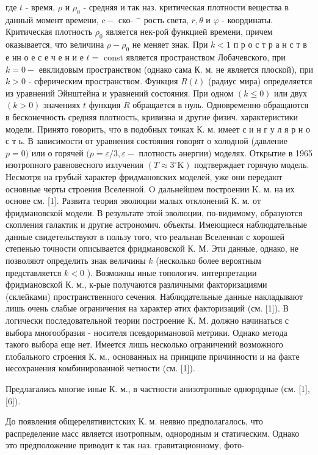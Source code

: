 \documentclass[10pt]{article}
\begin{document}
где $t$ - время, $\rho$ и $\rho_{0}$ - средняя и так наз. критическая плотности вещества в данный момент времени, $c-$ ско- $^{-}$ рость света, $r, \theta$ и $\varphi$ - координаты. Критическая плотность $\rho_{0}$ является нек-рой функцией времени, причем оказывается, что величина $\rho-\rho_{0}$ не меняет знак. При $k<1$ п р о с т р а н с т в е нн о е с е ч е н и е $t=$ const является пространством Лобачевского, при $k=0-$ евклидовым пространством (однако сама К. м. не является плоской), при $k>0$ - сферическим пространством. Функция $R(t)$ (радиус мира) определяется из уравнений Эйнштейна и уравнений состояния. При одном $(k \leqslant 0)$ или двух $(k>0)$ значениях $t$ функция $R$ обращается в нуль. Одновременно обращаются в бесконечность средняя плотность, кривизна и другие физич. характеристики модели. Принято говорить, что в подобных точках К. м. имеет с и н г у л я р н о с т ь. В зависимости от уравнения состояния говорят о холодной (давление $p=0)$ или о горячей $(p=\varepsilon / 3, \varepsilon-$ плотность әнергии) моделях. Открытие в 1965 изотропного равновесного излучения $\left(T \approx 3^{\circ} \mathrm{K}\right)$ подтверждает горячую модель. Несмотря на грубый характер фридмановских моделей, уже они передают основные черты строения Вселенной. $\mathrm{O}$ дальнейшем построении $\mathrm{K}$. м. на их основе см. [1]. Развита теория эволюции малых отклонений К. м. от фридмановской модели. В результате этой эволюции, по-видимому, образуются скопления галактик и другие астрономич. объекты. Имеющиеся наблюдательные данные свидетельствуют в пользу того, что реальная Вселенная с хорошей степенью точности описывается фридмановской К. М. Эти данные, однако, не позволяют определить знак величины $k$ (несколько более вероятным представляется $k<0$ ). Возможны иные топологич. интерпретации фридмановской К. м., к-рые получаются различными факторизациями (склейками) пространственного сечения. Наблюдательные данные накладывают лишь очень слабые ограничения на характер әтих факторизаций (см. [1]). В логически последовательной теории построение К. М. должно начинаться с выбора многообразия - носителя псевдоримановой метрики. Однако метода такого выбора еще нет. Имеется лишь несколько ограничений возможного глобального строения К. м., основанных на принципе причинности и на факте несохранения комбинированной четности (см. [1]).



Предлагались многие иные К. м., в частности анизотропные однородные (см. [1], [6]).



До появления общерелятивистских К. м. неявно предполагалось, что распределение масс является изотропным, однородным и статическим. Однако это предположение приводит к так наз. гравитационному, фото-
\end{document}
